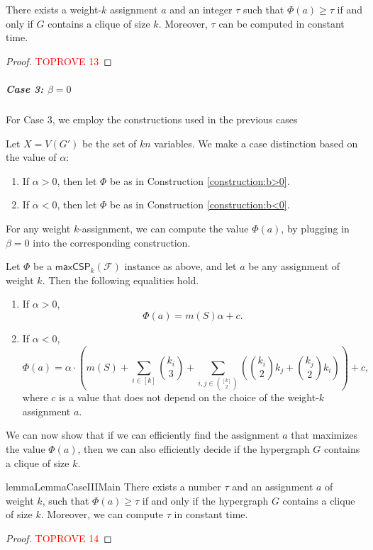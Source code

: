 \documentclass[a4paper,UKenglish,cleveref, autoref, thm-restate,numberwithinsect]{lipics-v2021}
\newcommand{\maxcspk}{\textsf{maxCSP}_{k}}
\newcommand{\Fam}{\mathcal{F}}
\begin{document}
\begin{lemma}\label{lemma:case-2-main-lemma}
    There exists a weight-$k$ assignment $a$ and an integer $\tau$ such that $\Phi(a)\geq \tau$ if and only if $G$ contains a clique of size $k$. Moreover, $\tau$ can be computed in constant time.
\end{lemma}
\begin{proof}\textcolor{red}{TOPROVE 13}\end{proof}
\subparagraph*{{Case 3: $\beta=0$}} 
For Case 3, we employ the constructions used in the previous cases
\begin{construction}\label{construction:b=0}
    Let $X = V(G')$ be the set of $kn$ variables.
    We make a case distinction based on the value of $\alpha$:
    \begin{enumerate}
        \item If $\alpha>0$, then let $\Phi$ be as in Construction \ref{construction:b>0}.
        \item If $\alpha<0$, then let $\Phi$ be as in Construction \ref{construction:b<0}.
    \end{enumerate}
\end{construction}
\medskip
For any weight $k$-assignment, we can compute the value $\Phi(a)$, by plugging in $\beta=0$ into the corresponding construction.
\begin{lemma}
    Let $\Phi$ be a $\maxcspk(\Fam)$ instance as above, and let $a$ be any assignment of weight $k$. 
    Then the following equalities hold.
    \begin{enumerate}
        \item If $\alpha>0$, 
        \[
            \Phi(a) = m(S)\alpha + c  .   
        \]
        \item  If $\alpha<0$,
        \[
        \Phi(a) = \alpha\cdot \left(m(S) + \sum_{i\in [k]}\binom{k_i}{3} + \sum_{i,j\in\binom{[k]}{2}}\left(\binom{k_i}{2}k_j + \binom{k_j}{2}k_i\right)\right) +  c,
        \]
        where $c$ is a value that does not depend on the choice of the weight-$k$ assignment $a$.
    \end{enumerate}
\end{lemma}
We can now show that if we can efficiently find the assignment $a$ that maximizes the value $\Phi(a)$, then we can also efficiently decide if the hypergraph $G$ contains a clique of size $k$.
\begin{restatable}{lemma}{LemmaCaseIIIMain}\label{lemma:main-lemma-case-3}
    There exists a number $\tau$ and an assignment $a$ of weight $k$, such that $\Phi(a)\geq \tau$ if and only if the hypergraph $G$ contains a clique of size $k$. Moreover, we can compute $\tau$ in constant time.
\end{restatable}
\begin{proof}\textcolor{red}{TOPROVE 14}\end{proof}
\end{document}
